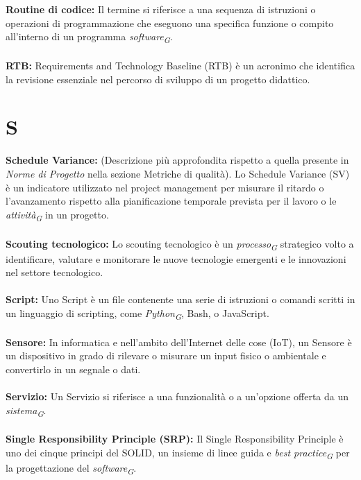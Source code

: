 \documentclass{article}
\begin{document}
\\
\\
\textbf{Routine di codice:} Il termine si riferisce a una sequenza di istruzioni o operazioni di programmazione che eseguono una specifica funzione o compito all'interno di un programma \textit{software}\textsubscript{\textit{G}}.
\\
\\
\textbf{RTB:} Requirements and Technology Baseline (RTB) è un acronimo che identifica la revisione essenziale nel percorso di sviluppo di un progetto didattico.
\\
\pagebreak
\section*{S}
{}
\textbf{Schedule Variance:} (Descrizione più approfondita rispetto a quella presente in \textit{Norme di Progetto} nella sezione Metriche di qualità). Lo Schedule Variance (SV) è un indicatore utilizzato nel project management per misurare il ritardo o l'avanzamento rispetto alla pianificazione temporale prevista per il lavoro o le \textit{attività}\textsubscript{\textit{G}} in un progetto.
\\
\\
\textbf{Scouting tecnologico:} Lo scouting tecnologico è un \textit{processo}\textsubscript{\textit{G}} strategico volto a identificare, valutare e monitorare le nuove tecnologie emergenti e le innovazioni nel settore tecnologico.
\\
\\
\textbf{Script:} Uno Script è un file contenente una serie di istruzioni o comandi scritti in un linguaggio di scripting, come \textit{Python}\textsubscript{\textit{G}}, Bash, o JavaScript.
\\
\\
\textbf{Sensore:} In informatica e nell'ambito dell'Internet delle cose (IoT), un Sensore è un dispositivo in grado di rilevare o misurare un input fisico o ambientale e convertirlo in un segnale o dati.
\\
\\
\textbf{Servizio:} Un Servizio si riferisce a una funzionalità o a un'opzione offerta da un \textit{sistema}\textsubscript{\textit{G}}.
\\
\\
\textbf{Single Responsibility Principle (SRP):} Il Single Responsibility Principle è uno dei cinque principi del SOLID, un insieme di linee guida e \textit{best practice}\textsubscript{\textit{G}} per la progettazione del \textit{software}\textsubscript{\textit{G}}.
\end{document}
